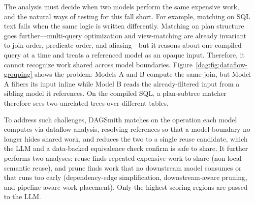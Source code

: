 The analysis must decide when two models perform the same expensive work, and the natural ways of testing for this fall short.
For example, matching on SQL text fails when the same logic is written differently. Matching on plan structure goes further—multi-query optimization and view-matching are already invariant to join order, predicate order, and aliasing—but it reasons about one compiled query at a time and treats a referenced model as an opaque input.
Therefore, it cannot recognize work shared across model boundaries. Figure~\ref{dag:fig:dataflow-grouping} shows the problem: Models A and B compute the same join, but Model A filters its input inline while Model B reads the already-filtered input from a sibling model it references. On the compiled SQL, a plan-subtree matcher therefore sees two unrelated trees over different tables.

To address such challenges, DAGSmith matches on the operation each model computes via dataflow analysis, resolving references so that a model boundary no longer hides shared work, and reduces the two to a single reuse candidate, which the LLM and a data-backed equivalence check confirm is safe to share. It further performs two analyses: reuse finds repeated expensive work to share (non-local semantic reuse), and prune finds work that no downstream model consumes or that runs too early (dependency-edge simplification, downstream-aware pruning, and pipeline-aware work placement). Only the highest-scoring regions are passed to the LLM.


